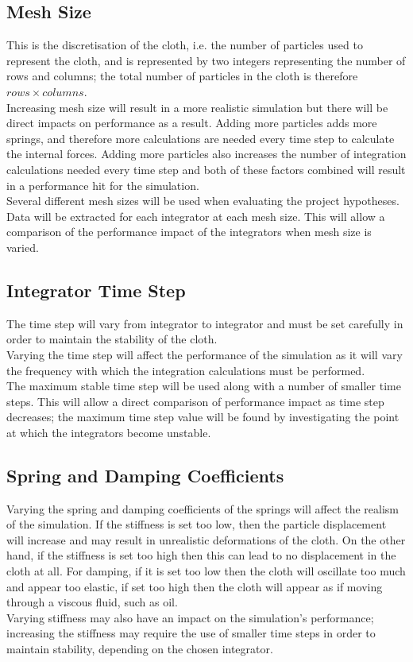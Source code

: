 \subsection{Mesh Size}
This is the discretisation of the cloth, i.e. the number of particles used to represent the cloth, and is represented by two integers representing the number of rows and columns; the total number of particles in the cloth is therefore $rows \times columns$.
\\Increasing mesh size will result in a more realistic simulation but there will be direct impacts on performance as a result. Adding more particles adds more springs, and therefore more calculations are needed every time step to calculate the internal forces. Adding more particles also increases the number of integration calculations needed every time step and both of these factors combined will result in a performance hit for the simulation.
\\Several different mesh sizes will be used when evaluating the project hypotheses. Data will be extracted for each integrator at each mesh size. This will allow a comparison of the performance impact of the integrators when mesh size is varied.

\subsection{Integrator Time Step}
The time step will vary from integrator to integrator and must be set carefully in order to maintain the stability of the cloth.
\\Varying the time step will affect the performance of the simulation as it will vary the frequency with which the integration calculations must be performed.
\\The maximum stable time step will be used along with a number of smaller time steps. This will allow a direct comparison of performance impact as time step decreases; the maximum time step value will be found by investigating the point at which the integrators become unstable.

\subsection{Spring and Damping Coefficients}
Varying the spring and damping coefficients of the springs will affect the realism of the simulation. If the stiffness is set too low, then the particle displacement will increase and may result in unrealistic deformations of the cloth. On the other hand, if the stiffness is set too high then this can lead to no displacement in the cloth at all. For damping, if it is set too low then the cloth will oscillate too much and appear too elastic, if set too high then the cloth will appear as if moving through a viscous fluid, such as oil.
\\Varying stiffness may also have an impact on the simulation's performance; increasing the stiffness may require the use of smaller time steps in order to maintain stability, depending on the chosen integrator.

